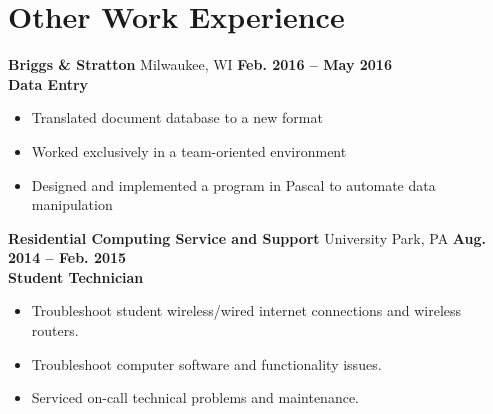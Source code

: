 \documentclass[letterpaper,10pt]{article}
\begin{document}
\section{Other Work Experience}
\textbf{Briggs \& Stratton} Milwaukee, WI \hfill \textbf{Feb. 2016 -- May 2016}\\
\textbf{Data Entry}
\begin{itemize}
\item Translated document database to a new format
\item Worked exclusively in a team-oriented environment
\item Designed and implemented a program in Pascal to automate data manipulation
\end{itemize}
\textbf{Residential Computing Service and Support} University Park, PA \hfill \textbf{Aug. 2014 – Feb. 2015}\\
\textbf{Student Technician}
\begin{itemize}
\item Troubleshoot student wireless/wired internet connections and wireless routers.
\item Troubleshoot computer software and functionality issues.
\item Serviced on-call technical problems and maintenance.
\end{itemize}
\end{document}
